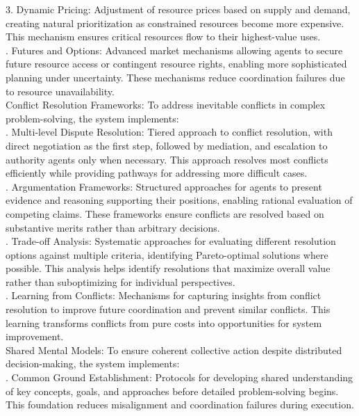 3. Dynamic Pricing: Adjustment of resource prices based on supply and demand, creating natural prioritization as constrained resources become more expensive. This mechanism ensures critical resources flow to their highest-value uses.\\ . Futures and Options: Advanced market mechanisms allowing agents to secure future resource access or contingent resource rights, enabling more sophisticated planning under uncertainty. These mechanisms reduce coordination failures due to resource unavailability.\\ \newline
Conflict Resolution Frameworks: To address inevitable conflicts in complex problem-solving, the system implements:\\ . Multi-level Dispute Resolution: Tiered approach to conflict resolution, with direct negotiation as the first step, followed by mediation, and escalation to authority agents only when necessary. This approach resolves most conflicts efficiently while providing pathways for addressing more difficult cases.\\ . Argumentation Frameworks: Structured approaches for agents to present evidence and reasoning supporting their positions, enabling rational evaluation of competing claims. These frameworks ensure conflicts are resolved based on substantive merits rather than arbitrary decisions.\\ . Trade-off Analysis: Systematic approaches for evaluating different resolution options against multiple criteria, identifying Pareto-optimal solutions where possible. This analysis helps identify resolutions that maximize overall value rather than suboptimizing for individual perspectives.\\ . Learning from Conflicts: Mechanisms for capturing insights from conflict resolution to improve future coordination and prevent similar conflicts. This learning transforms conflicts from pure costs into opportunities for system improvement.\\ \newline
Shared Mental Models: To ensure coherent collective action despite distributed decision-making, the system implements:\\ . Common Ground Establishment: Protocols for developing shared understanding of key concepts, goals, and approaches before detailed problem-solving begins. This foundation reduces misalignment and coordination failures during execution.\\ \newline
